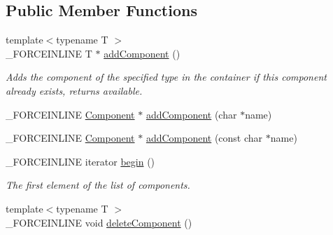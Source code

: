 \subsection*{Public Member Functions}
\begin{DoxyCompactItemize}
\item 
\hypertarget{classcsad_1_1_container_components_a0e2225fc644c2c455edf632558b67343}{{\footnotesize template$<$typename T $>$ }\\\-\_\-\-F\-O\-R\-C\-E\-I\-N\-L\-I\-N\-E T $\ast$ \hyperlink{classcsad_1_1_container_components_a0e2225fc644c2c455edf632558b67343}{add\-Component} ()}\label{classcsad_1_1_container_components_a0e2225fc644c2c455edf632558b67343}

\begin{DoxyCompactList}\small\item\em Adds the component of the specified type in the container if this component already exists, returns available. \end{DoxyCompactList}\item 
\-\_\-\-F\-O\-R\-C\-E\-I\-N\-L\-I\-N\-E \hyperlink{classcsad_1_1_component}{Component} $\ast$ \hyperlink{classcsad_1_1_container_components_ad7f66892f1d0c60447414f6026deddda}{add\-Component} (char $\ast$name)
\item 
\-\_\-\-F\-O\-R\-C\-E\-I\-N\-L\-I\-N\-E \hyperlink{classcsad_1_1_component}{Component} $\ast$ \hyperlink{classcsad_1_1_container_components_af12ffafe06c2e3f6713ea59cf7415874}{add\-Component} (const char $\ast$name)
\item 
\hypertarget{classcsad_1_1_container_components_a7e0dc30d9108b3c5d8601fc74cbe38a2}{\-\_\-\-F\-O\-R\-C\-E\-I\-N\-L\-I\-N\-E iterator \hyperlink{classcsad_1_1_container_components_a7e0dc30d9108b3c5d8601fc74cbe38a2}{begin} ()}\label{classcsad_1_1_container_components_a7e0dc30d9108b3c5d8601fc74cbe38a2}

\begin{DoxyCompactList}\small\item\em The first element of the list of components. \end{DoxyCompactList}\item 
\hypertarget{classcsad_1_1_container_components_abc6cb7a65d3f7e5405376bd8ecb787dc}{{\footnotesize template$<$typename T $>$ }\\\-\_\-\-F\-O\-R\-C\-E\-I\-N\-L\-I\-N\-E void \hyperlink{classcsad_1_1_container_components_abc6cb7a65d3f7e5405376bd8ecb787dc}{delete\-Component} ()}\label{classcsad_1_1_container_components_abc6cb7a65d3f7e5405376bd8ecb787dc}


\end{DoxyCompactItemize}
